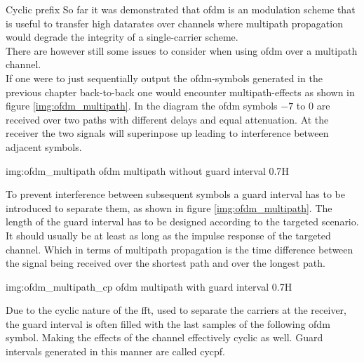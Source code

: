 \begin{subchapter}{Cyclic prefix}
  So far it was demonstrated that \gls{ofdm} is an modulation scheme
  that is useful to transfer high datarates over channels
  where multipath propagation would degrade the integrity of
  a single-carrier scheme. \\

  There are however still some issues to consider when using
  \gls{ofdm} over a multipath channel. \\

  If one were to just sequentially output the \acrshort{ofdm}-symbols
  generated in the previous chapter back-to-back one would encounter multipath-effects
  as shown in figure \ref{img:ofdm_multipath}.
  In the diagram the \acrshort{ofdm} symbols $-7$ to $0$ are received
  over two paths with different delays and equal attenuation.
  At the receiver the two signals will superinpose up leading to interference
  between adjacent symbols.

               {img:ofdm_multipath}
               {\acrshort{ofdm} multipath without guard interval}
               {0.7}{H}

  To prevent interference between subsequent symbols a guard interval has
  to be introduced to separate them, as shown in figure \ref{img:ofdm_multipath}.
  The length of the guard interval has to be designed according to
  the targeted scenario. It should usually be at least as long as the
  impulse response of the targeted channel.
  Which in terms of multipath propagation is the time difference between
  the signal being received over the shortest path and over the longest path.

               {img:ofdm_multipath_cp}
               {\acrshort{ofdm} multipath with guard interval}
               {0.7}{H}

  Due to the cyclic nature of the \gls{fft}, used to separate the
  carriers at the receiver, the guard interval
  is often filled with the last samples of the following \gls{ofdm}
  symbol. Making the effects of the channel effectively cyclic
  as well.
  Guard intervals generated in this manner are called \gls{cycpf}.
\end{subchapter}

